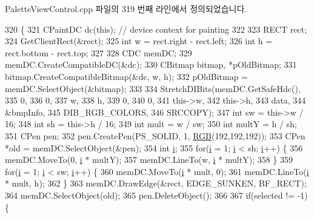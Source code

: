 Palette\+View\+Control.\+cpp 파일의 319 번째 라인에서 정의되었습니다.


\begin{DoxyCode}
320 \{
321   CPaintDC dc(\textcolor{keyword}{this}); \textcolor{comment}{// device context for painting}
322   
323   RECT rect;
324   GetClientRect(&rect);
325   \textcolor{keywordtype}{int} w = rect.right - rect.left;
326   \textcolor{keywordtype}{int} h = rect.bottom - rect.top;
327   
328   CDC memDC;
329   memDC.CreateCompatibleDC(&dc);
330   CBitmap bitmap, *pOldBitmap;
331   bitmap.CreateCompatibleBitmap(&dc, w, h);
332   pOldBitmap = memDC.SelectObject(&bitmap);
333   
334   StretchDIBits(memDC.GetSafeHdc(),
335                 0,
336                 0,
337                 w,
338                 h,
339                 0,
340                 0,
341                 this->w,
342                 this->h,
343                 data,
344                 &bmpInfo,
345                 DIB\_RGB\_COLORS,
346                 SRCCOPY);
347   \textcolor{keywordtype}{int} sw = this->w / 16;
348   \textcolor{keywordtype}{int} sh = this->h / 16;
349   \textcolor{keywordtype}{int} mult  = w / sw;
350   \textcolor{keywordtype}{int} multY = h / sh;
351   CPen pen;
352   pen.CreatePen(PS\_SOLID, 1, \mbox{\hyperlink{bilinear_8cpp_a4a118ad3ee36468a3fa616977a64864e}{RGB}}(192,192,192));
353   CPen *old = memDC.SelectObject(&pen);
354   \textcolor{keywordtype}{int} \mbox{\hyperlink{expr-lex_8cpp_acb559820d9ca11295b4500f179ef6392}{i}};
355   \textcolor{keywordflow}{for}(\mbox{\hyperlink{expr-lex_8cpp_acb559820d9ca11295b4500f179ef6392}{i}} = 1; \mbox{\hyperlink{expr-lex_8cpp_acb559820d9ca11295b4500f179ef6392}{i}} < sh; \mbox{\hyperlink{expr-lex_8cpp_acb559820d9ca11295b4500f179ef6392}{i}}++) \{
356     memDC.MoveTo(0, \mbox{\hyperlink{expr-lex_8cpp_acb559820d9ca11295b4500f179ef6392}{i}} * multY);
357     memDC.LineTo(w, \mbox{\hyperlink{expr-lex_8cpp_acb559820d9ca11295b4500f179ef6392}{i}} * multY);
358   \}
359   \textcolor{keywordflow}{for}(\mbox{\hyperlink{expr-lex_8cpp_acb559820d9ca11295b4500f179ef6392}{i}} = 1; \mbox{\hyperlink{expr-lex_8cpp_acb559820d9ca11295b4500f179ef6392}{i}} < sw; \mbox{\hyperlink{expr-lex_8cpp_acb559820d9ca11295b4500f179ef6392}{i}}++) \{
360     memDC.MoveTo(\mbox{\hyperlink{expr-lex_8cpp_acb559820d9ca11295b4500f179ef6392}{i}} * mult, 0);
361     memDC.LineTo(\mbox{\hyperlink{expr-lex_8cpp_acb559820d9ca11295b4500f179ef6392}{i}} * mult, h);
362   \}
363   memDC.DrawEdge(&rect, EDGE\_SUNKEN, BF\_RECT);
364   memDC.SelectObject(old);
365   pen.DeleteObject();
366 
367   \textcolor{keywordflow}{if}(selected != -1) \{

\end{DoxyCode}
